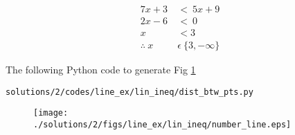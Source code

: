 
 \begin{align}
7x+3\ &<\ 5x+9 \\
2x - 6\  &< \  0 \\
x &< 3 \\
\therefore\  x\  &\epsilon\  \{3, -\infty \}
\end{align}

The  following Python code to generate Fig \ref{fig:3.11.2_numberline_lin_ineq} 
\begin{lstlisting}
solutions/2/codes/line_ex/lin_ineq/dist_btw_pts.py
\end{lstlisting}
 \begin{figure}[!ht]
\centering
\texttt{[image: ./solutions/2/figs/line\_ex/lin\_ineq/number\_line.eps]}
\caption{}
\label{fig:3.11.2_numberline_lin_ineq}
\end{figure} 



